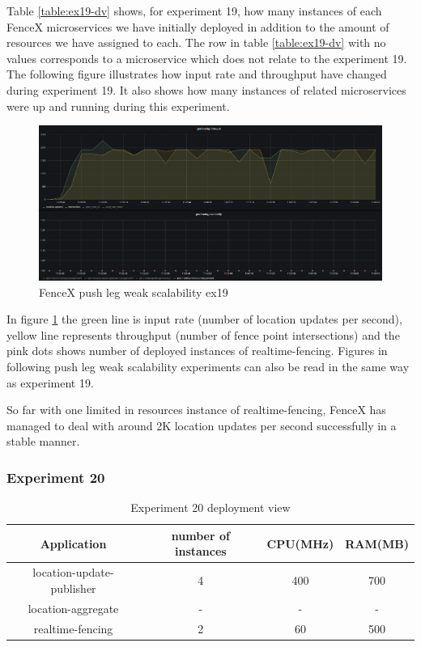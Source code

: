 \documentclass[a4]{report}
\begin{document}
    Table \ref{table:ex19-dv} shows, for experiment 19, how many instances of each FenceX microservices we have
    initially deployed in addition to the amount of resources we have assigned to each.
    The row in table \ref{table:ex19-dv} with no values corresponds to a microservice which does not relate to the
    experiment 19.
    The following figure illustrates how input rate and throughput have changed during experiment 19.
    It also shows how many instances of related microservices were up and running during this experiment.

    \begin{figure}[h!]
        \centering
        \caption{FenceX push leg weak scalability ex19}
        \label{fig:ex19}
        \includegraphics[width=\linewidth, scale=2]{images/evaluation/ex19-benchmarking-ongoing-1per16sec.png}
    \end{figure}

    In figure \ref{fig:ex19} the green line is input rate (number of location updates per second),
    yellow line represents throughput (number of fence point intersections) and the pink dots shows number of
    deployed instances of realtime-fencing.
    Figures in following push leg weak scalability experiments can also be read in the same way as experiment 19.

    So far with one limited in resources instance of realtime-fencing, FenceX has managed to deal with around 2K
    location updates per second successfully in a stable manner.

    \clearpage

    \subsubsection{Experiment 20}
    \begin{table}[h!]
        \centering
        \begin{tabular}{|c|c|c|c|}
            \hline
            Application               & number of instances & CPU(MHz) & RAM(MB) \\
            \hline
            location-update-publisher & 4                   & 400      & 700     \\
            location-aggregate        & -                   & -        & -       \\
            realtime-fencing          & 2                   & 60       & 500     \\
            \hline
        \end{tabular}
        \caption{Experiment 20 deployment view}
        \label{table:ex20-dv}
    \end{table}
\end{document}
